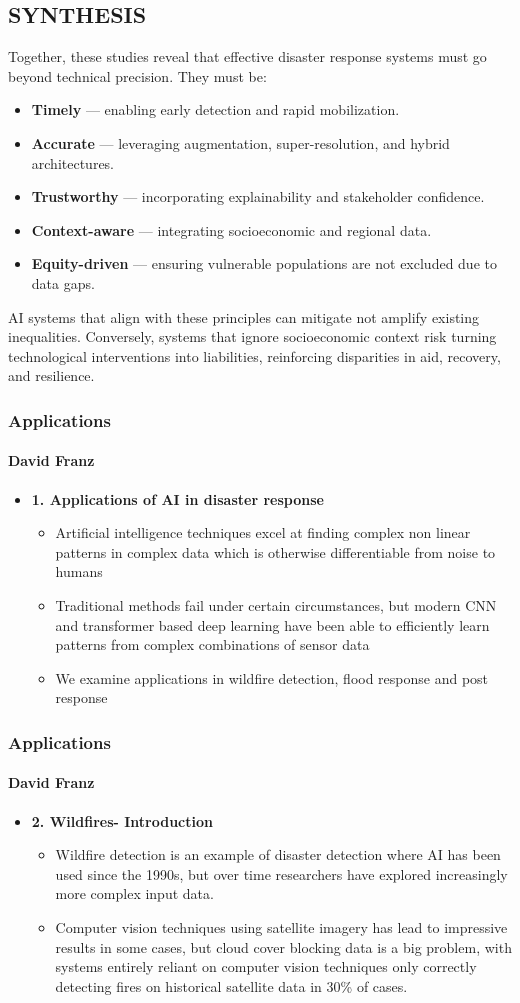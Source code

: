 \documentclass{beamer}
\newcommand{\namedframe}[3]{
  \begin{frame}
    \frametitle{#2}
    \framesubtitle{#1}
    #3
  \end{frame}
}
\begin{document}
{\subsection{SYNTHESIS}
Together, these studies reveal that effective disaster response systems must go beyond technical precision. They must be:
\begin{itemize}
    \item \textbf{Timely} — enabling early detection and rapid mobilization.
    \item \textbf{Accurate} — leveraging augmentation, super-resolution, and hybrid architectures.
    \item \textbf{Trustworthy} — incorporating explainability and stakeholder confidence.
    \item \textbf{Context-aware} — integrating socioeconomic and regional data.
    \item \textbf{Equity-driven} — ensuring vulnerable populations are not excluded due to data gaps.
\end{itemize}
AI systems that align with these principles can mitigate not amplify existing inequalities. Conversely, systems that ignore socioeconomic context risk turning technological interventions into liabilities, reinforcing disparities in aid, recovery, and resilience.
}


\namedframe{David Franz}{Applications}{
\begin{itemize}
    \item \textbf{1. Applications of AI in disaster response}
    \begin{itemize}
        \item Artificial intelligence techniques excel at finding complex non linear patterns in complex data which is otherwise differentiable from noise to humans
        \item Traditional methods fail under certain circumstances, but modern CNN and transformer based deep learning have been able to efficiently learn patterns from complex combinations of sensor data
        \item We examine applications in wildfire detection, flood response and post response
    \end{itemize}
\end{itemize}
}

\namedframe{David Franz}{Applications}{
\begin{itemize}
    \item \textbf{2. Wildfires- Introduction}
    \begin{itemize}
        \item Wildfire detection is an example of disaster detection where AI has been used since the 1990s, but over time researchers have explored increasingly more complex input data.
        \item Computer vision techniques using satellite imagery has lead to impressive results in some cases, but cloud cover blocking data is a big problem, with systems entirely reliant on computer vision techniques only correctly detecting fires on historical satellite data in 30\% of cases.
    \end{itemize}
\end{itemize}
}
\end{document}
